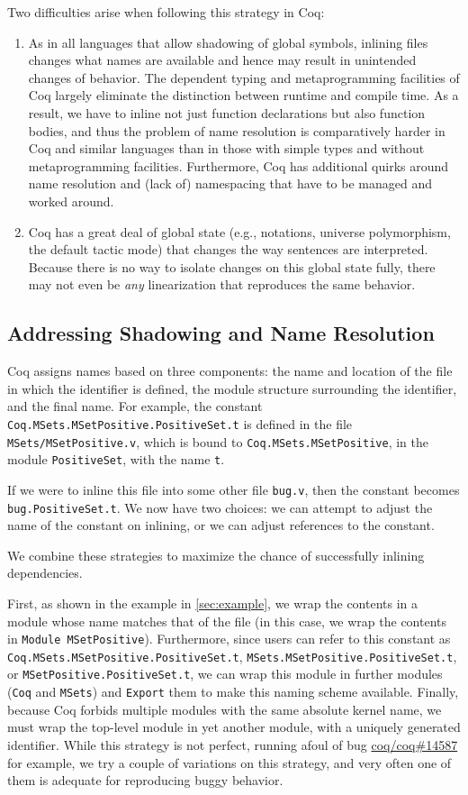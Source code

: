 \documentclass[a4paper,USenglish,cleveref,autoref,thm-restate,pdfa]{lipics-v2021}
\newcommand{\coqbug}[1]{\href{https://github.com/coq/coq/issues/#1}{coq/coq\##1}}
\begin{document}
Two difficulties arise when following this strategy in Coq:
\begin{enumerate}
\item As in all languages that allow shadowing of global symbols, inlining files changes what names are available and hence may result in unintended changes of behavior.
The dependent typing and metaprogramming facilities of Coq largely eliminate the distinction between runtime and compile time.
As a result, we have to inline not just function declarations but also function bodies, and thus the problem of name resolution is comparatively harder in Coq and similar languages than in those with simple types and without metaprogramming facilities.
Furthermore, Coq has additional quirks around name resolution and (lack of) namespacing that have to be managed and worked around.
\item Coq has a great deal of global state (e.g., notations, universe polymorphism, the default tactic mode) that changes the way sentences are interpreted.
Because there is no way to isolate changes on this global state fully, there may not even be \emph{any} linearization that reproduces the same behavior.
\end{enumerate}

\subsection{Addressing Shadowing and Name Resolution}\label{sec:name-resolution}
Coq assigns names based on three components: the name and location of the file in which the identifier is defined, the module structure surrounding the identifier, and the final name.
For example, the constant \texttt{Coq.MSets.MSetPositive.PositiveSet.t} is defined in the file \texttt{MSets/MSetPositive.v}, which is bound to \texttt{Coq.MSets.MSetPositive}, in the module \texttt{PositiveSet}, with the name \texttt{t}.

If we were to inline this file into some other file \texttt{bug.v}, then the constant becomes \texttt{bug.PositiveSet.t}.
We now have two choices: we can attempt to adjust the name of the constant on inlining, or we can adjust references to the constant.

We combine these strategies to maximize the chance of successfully inlining dependencies.

First, as shown in the example in \autoref{sec:example}, we wrap the contents in a module whose name matches that of the file (in this case, we wrap the contents in \texttt{Module MSetPositive}).
Furthermore, since users can refer to this constant as \texttt{Coq.MSets.MSetPositive.PositiveSet.t}, \texttt{MSets.MSetPositive.PositiveSet.t}, or \texttt{MSetPositive.PositiveSet.t}, we can wrap this module in further modules (\texttt{Coq} and \texttt{MSets}) and \texttt{Export} them to make this naming scheme available.
Finally, because Coq forbids multiple modules with the same absolute kernel name, we must wrap the top-level module in yet another module, with a uniquely generated identifier.
While this strategy is not perfect, running afoul of bug \coqbug{14587} for example, we try a couple of variations on this strategy, and very often one of them is adequate for reproducing buggy behavior.
\end{document}

